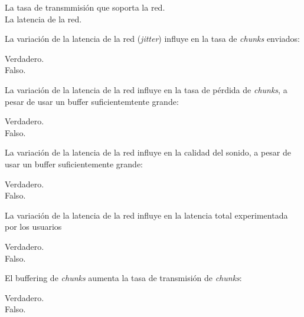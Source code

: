 \documentclass[legalpaper, 12pt, addpoints]{exam}
\begin{document}
\begin{questions}
\begin{oneparchoices}
  \choice La tasa de transmmisión que soporta la red.\\
  \choice La latencia de la red.
\end{oneparchoices}
  
\vspace{0.10in}

\question La variación de la latencia de la red (\emph{jitter}) influye en la tasa de \emph{chunks} enviados:

\begin{oneparchoices}
  \choice Verdadero.\\
  \choice Falso.
\end{oneparchoices}
  
\vspace{0.10in}

\question La variación de la latencia de la red influye en la tasa de pérdida de \emph{chunks}, a pesar de usar un buffer suficientemtente grande:

\begin{oneparchoices}
  \choice Verdadero.\\
  \choice Falso.
\end{oneparchoices}
  
\vspace{0.10in}

\question La variación de la latencia de la red influye en la calidad del sonido, a pesar de usar un buffer suficientemente grande:

\begin{oneparchoices}
  \choice Verdadero.\\
  \choice Falso.
\end{oneparchoices}
  
\vspace{0.10in}

\question La variación de la latencia de la red influye en la latencia total experimentada por los usuarios

\begin{oneparchoices}
  \choice Verdadero.\\
  \choice Falso.
\end{oneparchoices}
  
\vspace{0.10in}

\question El buffering de \emph{chunks} aumenta la tasa de transmisión de \emph{chunks}:

\begin{oneparchoices}
  \choice Verdadero.\\
  \choice Falso.
\end{oneparchoices}
  

\end{questions}
\end{document}
